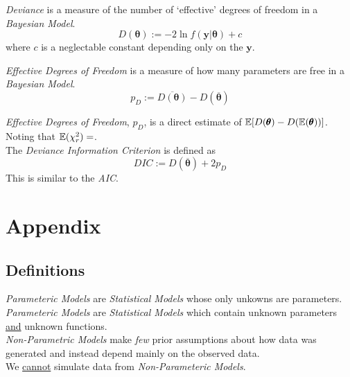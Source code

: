 \documentclass[11pt,a4paper]{article}
\begin{document}
\textit{Deviance} is a measure of the number of `effective' degrees of freedom in a \textit{Bayesian Model}.
$$D(\pmb\theta):=-2\ln f(\textbf{y}|\pmb\theta)+c$$
where $c$ is a neglectable constant depending only on the $\textbf{y}$.\\


\textit{Effective Degrees of Freedom} is a measure of how many parameters are free in a \textit{Bayesian Model}.
$$p_D:=\overline{D(\pmb\theta)}-D(\overline{\pmb\theta})$$

\remark{}
\textit{Effective Degrees of Freedom}, $p_D$, is a direct estimate of $\mathbb{E}[D(\pmb\theta)-D(\mathbb{E}(\pmb\theta))]$.\\
Noting that $\mathbb{E}(\chi^2_r)=$.\\

The \textit{Deviance Information Criterion} is defined as
$$DIC:=D(\overline{\pmb\theta})+2p_D$$
\nb This is similar to the \textit{AIC}.

\newpage\setcounter{section}{-1}
\section{Appendix}

\subsection{Definitions}


\textit{Parameteric Models} are \textit{Statistical Models} whose only unkowns are parameters.\\

\textit{Parameteric Models} are \textit{Statistical Models} which contain unknown parameters \underline{and} unknown functions.\\

\textit{Non-Parametric Models} make \textit{few} prior assumptions about how data was generated and instead depend mainly on the observed data.\\
We \underline{cannot} simulate data from \textit{Non-Parameteric Models}.\\
\end{document}
